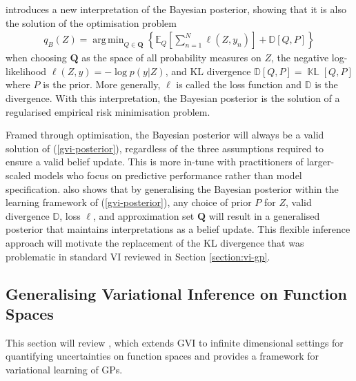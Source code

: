 \documentclass{article}
\newcommand{\KLD}{\operatorname{\mathbb{KL}}}
\DeclareMathOperator*{\argmin}{arg\,min}
\numberwithin{equation}{section}
\begin{document}
\cite{knoblauch2022optimization} introduces a new interpretation of the Bayesian posterior, showing that it is also the solution of the optimisation problem
\begin{align}
    q_B(Z) = \argmin_{Q \in \boldsymbol{Q}} \left\{\mathbb{E}_{Q}\left[\sum_{n=1}^N \ell \left(Z, y_n\right)\right] + \mathbb{D}\left[Q, P\right]\right\}
    \label{gvi-posterior}
\end{align}
when choosing $\boldsymbol{Q}$ as the space of all probability measures on $Z$, the negative log-likelihood $\ell(Z, y) =-\log p\left(y \vert Z\right)$,  and KL divergence $\mathbb{D}\left[Q, P\right] = \KLD\left[Q, P\right]$ where $P$ is the prior. 
More generally, $\ell$ is called the loss function and $\mathbb{D}$ is the divergence. With this interpretation, the Bayesian posterior is the solution of a regularised empirical risk minimisation problem.

Framed through optimisation, the Bayesian posterior will always be a valid solution of (\ref{gvi-posterior}), regardless of the three  assumptions required to ensure a valid belief update.
This is more in-tune with practitioners of larger-scaled models who focus on predictive performance rather than model specification. 
\cite{knoblauch2022optimization} also shows that by generalising the Bayesian posterior within the learning framework of (\ref{gvi-posterior}), any choice of prior $P$ for $Z$, valid divergence $\mathbb{D}$, loss $\ell$, and approximation set $\boldsymbol{Q}$ will result in a generalised posterior that maintains interpretations as a belief update.
This flexible inference approach will motivate the replacement of the KL divergence that was problematic in standard VI reviewed in Section \ref{section:vi-gp}.

\subsection{Generalising Variational Inference on Function Spaces}
This section will review \cite{wild2022generalized}, which extends GVI to infinite dimensional settings for quantifying uncertainties on function spaces and provides a framework for variational learning of GPs.
\end{document}
